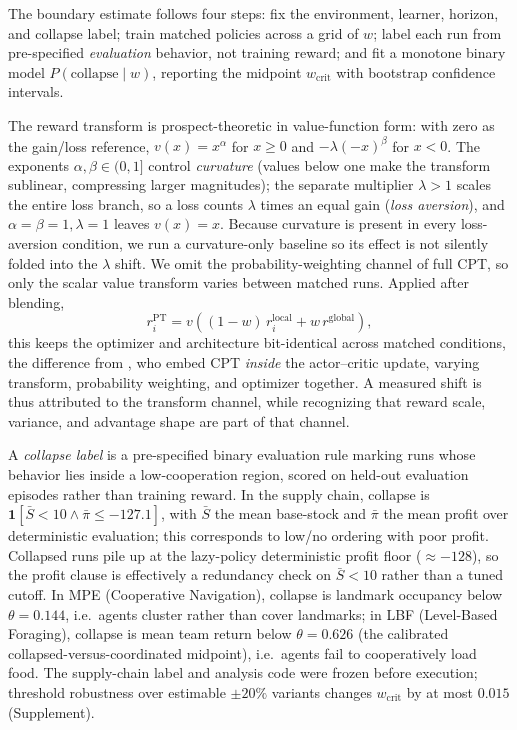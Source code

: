 \documentclass[letterpaper]{article} %
\theoremstyle{plain}
\newcommand{\wcrit}{w_{\mathrm{crit}}}
\newcommand{\PT}{\mathrm{PT}}
\begin{document}
The boundary estimate follows four steps: fix the environment, learner, horizon, and collapse
label; train matched policies across a grid of $w$; label each run from pre-specified
\emph{evaluation} behavior, not training reward; and fit a monotone binary model
$P(\mathrm{collapse}\mid w)$, reporting the midpoint $\wcrit$ with bootstrap confidence intervals.

The reward transform is prospect-theoretic in value-function form: with zero as the gain/loss
reference, $v(x)=x^\alpha$ for $x\ge0$ and $-\lambda(-x)^\beta$ for $x<0$. The exponents
$\alpha,\beta\in(0,1]$ control \emph{curvature} (values below one make the transform sublinear, compressing
larger magnitudes); the separate multiplier $\lambda>1$ scales the entire loss branch, so a loss counts $\lambda$
times an equal gain (\emph{loss aversion}), and $\alpha{=}\beta{=}1,\lambda{=}1$ leaves $v(x)=x$.
Because curvature is present in every loss-aversion condition, we run a curvature-only baseline so its
effect is not silently folded into the $\lambda$ shift. We omit the probability-weighting channel of
full CPT, so only the scalar value transform varies between matched runs. Applied after blending,
\begin{equation}
 r_i^{\PT}=v\!\left((1-w)\,r_i^{\mathrm{local}}+w\,r^{\mathrm{global}}\right),
 \label{eq:reward}
\end{equation}
this keeps the optimizer and architecture bit-identical across matched conditions, the difference
from \citet{lalmohammed2025}, who embed CPT \emph{inside} the actor--critic update, varying transform,
probability weighting, and optimizer together. A measured shift is thus attributed to the transform
channel, while recognizing that reward scale, variance, and advantage shape are part of that channel.

A \emph{collapse label} is a pre-specified binary evaluation rule marking runs whose behavior lies
inside a low-cooperation region, scored on held-out evaluation episodes rather than training reward.
In the supply chain, collapse is $\mathbf{1}[\bar S<10\wedge\bar\pi\le-127.1]$, with $\bar S$ the
mean base-stock and $\bar\pi$ the mean profit over deterministic evaluation; this corresponds to
low/no ordering with poor profit. Collapsed runs pile up at the lazy-policy deterministic
profit floor ($\approx-128$), so the profit clause is effectively a redundancy check on
$\bar S<10$ rather than a tuned cutoff. In MPE (Cooperative Navigation), collapse is landmark
occupancy below $\theta=0.144$, i.e.\ agents cluster rather than cover landmarks; in LBF
(Level-Based Foraging), collapse is mean team return below $\theta=0.626$ (the calibrated
collapsed-versus-coordinated midpoint), i.e.\ agents fail to cooperatively load food. The supply-chain
label and analysis code were frozen before execution; threshold robustness over estimable $\pm20\%$
variants changes $\wcrit$ by at most $0.015$ (Supplement).
\end{document}
